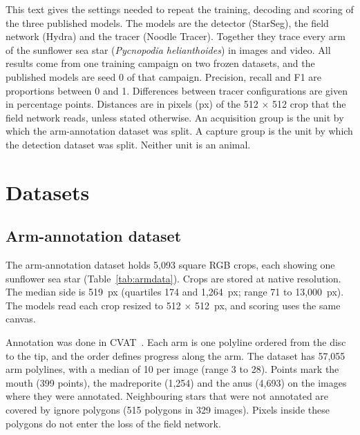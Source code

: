 
This text gives the settings needed to repeat the training, decoding and scoring of the three published models.
The models are the detector (StarSeg), the field network (Hydra) and the tracer (Noodle Tracer).
Together they trace every arm of the sunflower sea star (\textit{Pycnopodia helianthoides}) in images and video.
All results come from one training campaign on two frozen datasets, and the published models are seed 0 of that campaign.
Precision, recall and F1 are proportions between 0 and 1.
Differences between tracer configurations are given in percentage points.
Distances are in pixels (px) of the 512 $\times$ 512 crop that the field network reads, unless stated otherwise.
An acquisition group is the unit by which the arm-annotation dataset was split.
A capture group is the unit by which the detection dataset was split.
Neither unit is an animal.

\section*{Datasets}

\subsection*{Arm-annotation dataset}

The arm-annotation dataset holds 5,093 square RGB crops, each showing one sunflower sea star (Table~\ref{tab:armdata}).
Crops are stored at native resolution.
The median side is 519~px (quartiles 174 and 1,264~px; range 71 to 13,000~px).
The models read each crop resized to 512 $\times$ 512~px, and scoring uses the same canvas.

Annotation was done in CVAT~\cite{cvat2026computer}.
Each arm is one polyline ordered from the disc to the tip, and the order defines progress along the arm.
The dataset has 57,055 arm polylines, with a median of 10 per image (range 3 to 28).
Points mark the mouth (399 points), the madreporite (1,254) and the anus (4,693) on the images where they were annotated.
Neighbouring stars that were not annotated are covered by ignore polygons (515 polygons in 329 images).
Pixels inside these polygons do not enter the loss of the field network.

